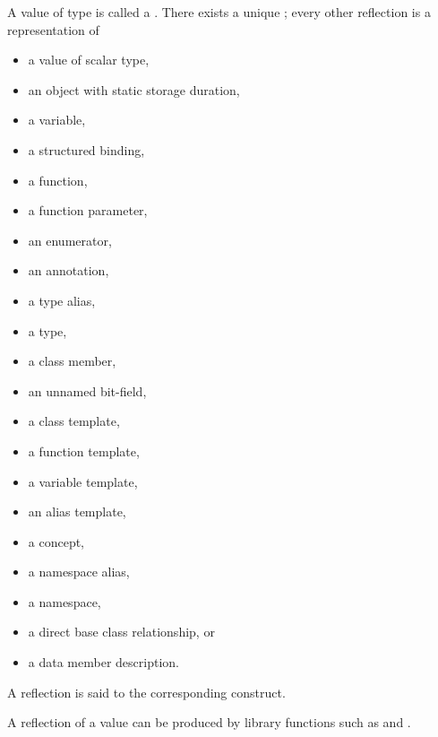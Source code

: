 \pnum
A value of type  is called a .
There exists a unique ;
every other reflection is a representation of
\begin{itemize}
\item a value of scalar type,
\item an object with static storage duration,
\item a variable,
\item a structured binding,
\item a function,
\item a function parameter,
\item an enumerator,
\item an annotation,
\item a type alias,
\item a type,
\item a class member,
\item an unnamed bit-field,
\item a class template,
\item a function template,
\item a variable template,
\item an alias template,
\item a concept,
\item a namespace alias,
\item a namespace,
\item a direct base class relationship, or
\item a data member description.
\end{itemize}
A reflection is said to  the corresponding construct.
\begin{note}
A reflection of a value can be produced by library functions such as
 and .
\end{note}
